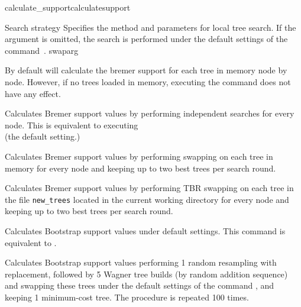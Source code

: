 \begin{command}{calculate\_support}{calculatesupport}
\begin{arguments}
\begin{argumentgroup}{Search strategy}
            {Specifies the method and parameters for local tree search. If the
            argument  is omitted, the search is performed under
            the default settings of the command~.} 
            {swaparg}
	     
        		\end{argumentgroup}

	\end{arguments}

    {By default \poy will calculate the bremer support for each tree in memory node by node.
    However, if no trees loaded in memory, executing the command
     does not have any effect.}

	\begin{poyexamples} 

            {Calculates Bremer support values by performing
            independent searches for every node. This is equivalent to executing \\
             (the default setting.)}
         
            {Calculates Bremer support values by performing swapping on 
            each tree in memory for every node and keeping up to two
            best trees per search round.}
          
            {Calculates Bremer support values by performing TBR swapping on 
            each tree in the file \texttt{new\_trees} located in the current
            working directory for every node and keeping up to two
            best trees per search round.}  
            
         {Calculates Bootstrap support values under default settings. This command
         is equivalent to .}
	
            {Calculates Bootstrap support values performing 1 random resampling with
            replacement, followed by 5 Wagner tree builds (by random addition sequence)
            and swapping these trees under the default settings of the command 
            , and keeping 1 minimum-cost tree. The procedure
            is repeated 100 times.}
        

\end{poyexamples}
\end{command}

